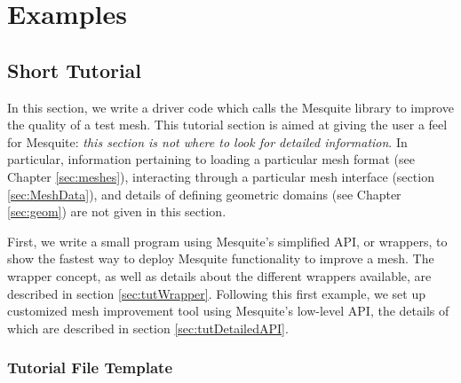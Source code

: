 \chapter{Examples} \label{sec:examples}

\section{Short Tutorial}

In this section, we write a driver code which calls the Mesquite
library to improve the quality of a test mesh. This tutorial section
is aimed at giving the user a feel for Mesquite: \emph{this section is not
where to look for detailed information}. In particular, information
pertaining to loading a particular mesh format (see Chapter \ref{sec:meshes}), 
interacting through a particular mesh interface (section \ref{sec:MeshData}), 
and details of defining geometric domains (see Chapter \ref{sec:geom}) are not
given in this section.

First, we write a small program using Mesquite's simplified API, or
wrappers, to show the fastest way to deploy Mesquite functionality to
improve a mesh.  The wrapper concept, as well as details about the
different wrappers available, are described in section
\ref{sec:tutWrapper}.  Following this first example, we set up customized mesh
improvement tool using Mesquite's low-level API, the details of which
are described in section \ref{sec:tutDetailedAPI}.

\subsection{Tutorial File Template}
\label{sec:tutfile}

